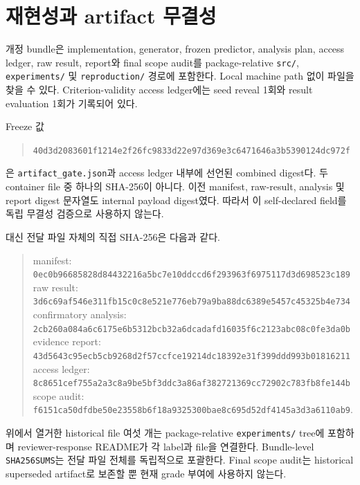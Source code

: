 \section{재현성과 artifact 무결성}
\label{sec:reproducibility}

개정 bundle은 implementation, generator, frozen predictor, analysis plan,
access ledger, raw result, report와 final scope audit를 package-relative
\texttt{src/}, \texttt{experiments/} 및 \texttt{reproduction/} 경로에 포함한다.
Local machine path 없이 파일을 찾을 수 있다. Criterion-validity access ledger에는
seed reveal 1회와 result evaluation 1회가 기록되어 있다.

Freeze 값
\begin{quote}\small
\texttt{40d3d2083601f1214e2f26fc9833d22e97d369e3c6471646a3b5390124dc972f}
\end{quote}
은 \texttt{artifact\_gate.json}과 access ledger 내부에 선언된 combined digest다.
두 container file 중 하나의 SHA-256이 아니다. 이전 manifest, raw-result,
analysis 및 report digest 문자열도 internal payload digest였다. 따라서 이
self-declared field를 독립 무결성 검증으로 사용하지 않는다.

대신 전달 파일 자체의 직접 SHA-256은 다음과 같다.
\begin{quote}\small
manifest:\\ \texttt{0ec0b96685828d84432216a5bc7e10ddccd6f293963f6975117d3d698523c189}\\
raw result:\\ \texttt{3d6c69af546e311fb15c0c8e521e776eb79a9ba88dc6389e5457c45325b4e734}\\
confirmatory analysis:\\ \texttt{2cb260a084a6c6175e6b5312bcb32a6dcadafd16035f6c2123abc08c0fe3da0b}\\
evidence report:\\ \texttt{43d5643c95ecb5cb9268d2f57ccfce19214dc18392e31f399ddd993b01816211}\\
access ledger:\\ \texttt{8c8651cef755a2a3c8a9be5bf3ddc3a86af382721369cc72902c783fb8fe144b}\\
scope audit:\\ \texttt{f6151ca50dfdbe50e23558b6f18a9325300bae8c695d52df4145a3d3a6110ab9}.
\end{quote}
위에서 열거한 historical file 여섯 개는 package-relative \texttt{experiments/}
tree에 포함하며 reviewer-response README가 각 label과 file을 연결한다. Bundle-level
\texttt{SHA256SUMS}는 전달 파일 전체를 독립적으로 포괄한다. Final scope
audit는 historical superseded artifact로 보존할 뿐 현재 grade 부여에 사용하지 않는다.

